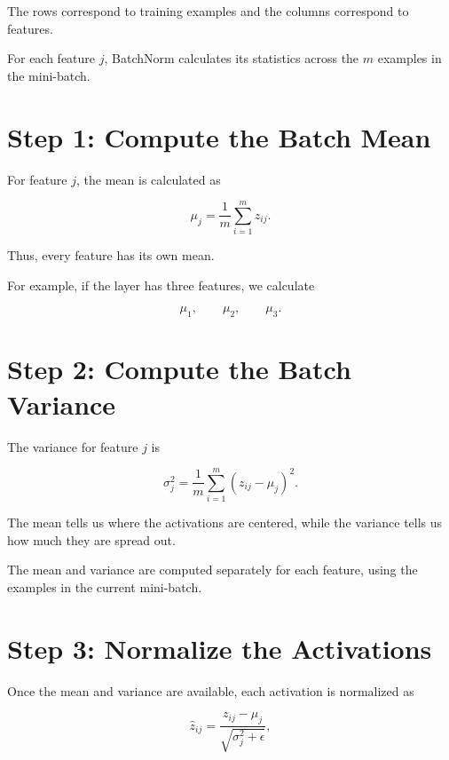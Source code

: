 \documentclass[11pt,a4paper]{article}
\begin{document}
	The rows correspond to training examples and the columns correspond to
	features.
	
	For each feature $j$, BatchNorm calculates its statistics across the
	$m$ examples in the mini-batch.
	
	\section{Step 1: Compute the Batch Mean}
	
	For feature $j$, the mean is calculated as
	
	\begin{equation}
		\mu_j =
		\frac{1}{m}
		\sum_{i=1}^{m} z_{ij}.
	\end{equation}
	
	Thus, every feature has its own mean.
	
	For example, if the layer has three features, we calculate
	
	\[
	\mu_1,\qquad \mu_2,\qquad \mu_3.
	\]
	
	\section{Step 2: Compute the Batch Variance}
	
	The variance for feature $j$ is
	
	\begin{equation}
		\sigma_j^2 =
		\frac{1}{m}
		\sum_{i=1}^{m}
		(z_{ij}-\mu_j)^2.
	\end{equation}
	
	The mean tells us where the activations are centered, while the variance
	tells us how much they are spread out.
	
	\begin{important}
		The mean and variance are computed separately for each feature, using the
		examples in the current mini-batch.
	\end{important}
	
	\section{Step 3: Normalize the Activations}
	
	Once the mean and variance are available, each activation is normalized as
	
	\begin{equation}
		\hat{z}_{ij}
		=
		\frac{z_{ij}-\mu_j}
		{\sqrt{\sigma_j^2+\epsilon}},
	\end{equation}
	
\end{document}
